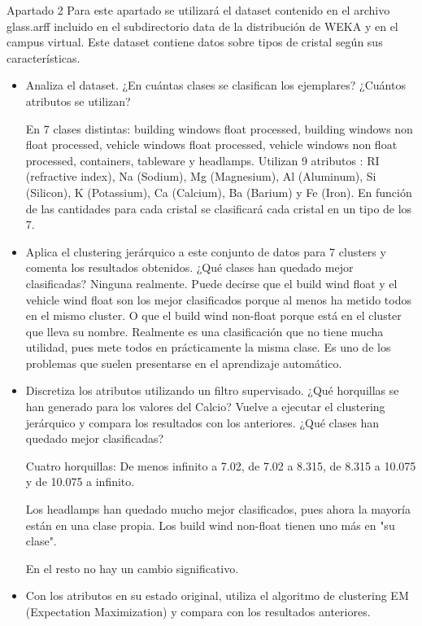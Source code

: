 \documentclass[11pt, a4paper, spanish, openright, twoside]{book}
\begin{document}
\begin{section}{Apartado 2}
	Para este apartado se utilizará el dataset contenido en el archivo glass.arff incluido en el subdirectorio
	data de la distribución de WEKA y en el campus virtual. Este dataset contiene datos sobre tipos de
	cristal según sus características.

	\begin{itemize}
	\item Analiza el dataset. ¿En cuántas clases se clasifican los ejemplares? ¿Cuántos atributos se utilizan?

	En 7 clases distintas: building windows float processed, building windows non float processed, vehicle windows float  processed,  vehicle windows non float processed, containers, tableware y headlamps.
	Utilizan 9 atributos : RI (refractive index),  Na (Sodium), Mg (Magnesium),  Al (Aluminum), Si (Silicon),  K (Potassium), Ca (Calcium), Ba (Barium) y Fe (Iron). En función de las cantidades para cada cristal se clasificará cada 
	cristal en un tipo de los 7.

	\item Aplica el clustering jerárquico a este conjunto de datos para 7 clusters y comenta los resultados 
	obtenidos. ¿Qué clases han quedado mejor clasificadas?
	Ninguna realmente. Puede decirse que el build wind float y el vehicle wind float son los mejor clasificados porque al menos ha metido todos en el mismo cluster. O que 
	el build wind non-float porque está en el cluster que lleva su nombre. Realmente es una clasificación que no tiene mucha utilidad, pues mete todos en prácticamente la misma clase. 
	Es uno de los problemas que suelen presentarse en  el aprendizaje automático.
	
	\item Discretiza los atributos utilizando un filtro supervisado. ¿Qué horquillas se han generado para los 
	valores del Calcio? Vuelve a ejecutar el clustering jerárquico y compara los resultados con los 
	anteriores. ¿Qué clases han quedado mejor clasificadas?

	Cuatro horquillas: De menos infinito a 7.02, de 7.02 a 8.315, de 8.315 a 10.075 y de 10.075 a infinito.

	Los headlamps han quedado mucho mejor clasificados, pues ahora la mayoría están en una clase propia. Los build wind non-float tienen uno más en "su clase".

	En el resto no hay un cambio significativo.

	\item Con los atributos en su estado original, utiliza el algoritmo de clustering EM (Expectation 
	Maximization) y compara con los resultados anteriores.
	

\end{itemize}
\end{section}
\end{document}
